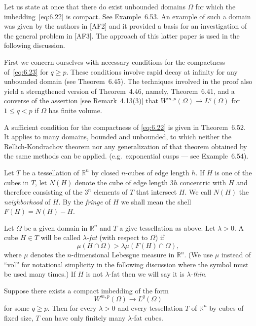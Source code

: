 \begin{para}
  Let us state at once that there do exist unbounded domains $\Omega$
  for which the imbedding~\eqref{eq:6.22} is compact. See Example~6.53.
  An example of such a domain was given by the authors in [AF2] and it provided
  a basis for an investigation of the general problem in [AF3].
  The approach of this latter paper is used in the following discussion.

  First we concern ourselves with necessary conditions for the compactness
  of~\eqref{eq:6.23} for $q\geq p$. These conditions involve rapid decay at
  infinity for any unbounded domain (see Theorem~6.45). The techniques
  involved in the proof also yield a strengthened version of Theorem~4.46,
  namely, Theorem~6.41, and a converse of the assertion [see Remark~4.13(3)]
  that $W^{m,p}(\Omega) \to L^q(\Omega)$ for $1\leq q<p$ if $\Omega$ has finite volume.

  A sufficient condition for the compactness of \eqref{eq:6.22} is given in
  Theorem~6.52. It applies to many domains, bounded and unbounded, to which
  neither the Rellich-Kondrachov theorem nor any generalization of that theorem
  obtained by the same methods can be applied. (e.g.~exponential cusps --- see Example~6.54).
\end{para}


\begin{para}
  Let $T$ be a tessellation of $\mathbb{R}^n$ by closed $n$-cubes of edge length $h$.
  If $H$ is one of the cubes in $T$, let $N(H)$ denote the cube of edge length
  $3h$ concentric with $H$ and therefore consisting of the $3^n$ elements
  of $T$ that intersect $H$. We call $N(H)$ the \emph{neighborhood} of $H$.
  By the \emph{fringe} of $H$ we shall mean the shell $F(H) = N(H)-H$.

  Let $\Omega$ be a given domain in $\mathbb{R}^n$ and $T$ a give tessellation as above.
  Let $\lambda>0$. A cube $H\in T$ will be called $\lambda$-\emph{fat} (with respect to $\Omega$) if
  \[ \mu(H\cap\Omega) > \lambda \mu(F(H)\cap\Omega), \]
  where $\mu$ denotes the $n$-dimensional Lebesgue measure in $\mathbb{R}^n$.
  (We use $\mu$ instead of ``vol'' for notational simplicity in the following
  discussion where the symbol must be used many times.)
  If $H$ is not $\lambda$-fat then we will say it is $\lambda$-\emph{thin}.
\end{para}


\begin{theorem}
  Suppose there exists a compact imbedding of the form
  \[ W^{m,p}(\Omega) \to L^q(\Omega) \]
  for some $q\geq p$. Then for every $\lambda>0$ and every tessellation 
  $T$ of $\mathbb{R}^n$ by cubes of fixed size, $T$ can have only finitely
  many $\lambda$-fat cubes.
\end{theorem}

